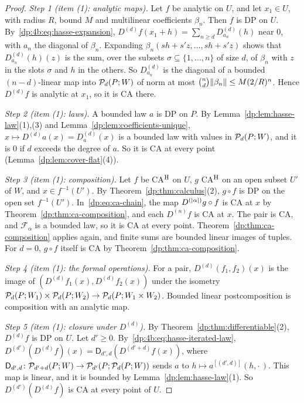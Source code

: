 \begin{proof}
\emph{Step 1 (item (1): analytic maps).} Let $f$ be analytic on $U$, and let $x_1\in U$, with radius $R$, bound $M$ and multilinear coefficients $\beta_n$. Then $f$ is DP on $U$. By~\eqref{dp:4b:eq:hasse-expansion}, $D^{(d)}f(x_1+h)=\sum_{n\ge d}D^{(d)}_{a_n}(h)$ near $0$, with $a_n$ the diagonal of $\beta_n$. Expanding $\beta_n(sh+s'z,\dots,sh+s'z)$ shows that $D^{(d)}_{a_n}(h)(z)$ is the sum, over the subsets $\sigma\subseteq\{1,\dots,n\}$ of size $d$, of $\beta_n$ with $z$ in the slots $\sigma$ and $h$ in the others. So $D^{(d)}_{a_n}$ is the diagonal of a bounded $(n-d)$-linear map into $\mathcal P_d(P;W)$ of norm at most $\binom nd\lVert \beta_n\rVert\le M(2/R)^n$. Hence $D^{(d)}f$ is analytic at $x_1$, so it is CA there.

\emph{Step 2 (item (1): laws).} A bounded law $a$ is DP on $P$. By Lemma~\ref{dp:lem:hasse-law}(1),(3) and Lemma~\ref{dp:lem:coefficients-unique}, $x\mapsto D^{(d)}a(x)=D^{(d)}_a(x)$ is a bounded law with values in $\mathcal P_d(P;W)$, and it is $0$ if $d$ exceeds the degree of $a$. So it is CA at every point (Lemma~\ref{dp:lem:cover-flat}(4)).

\emph{Step 3 (item (1): composition).} Let $f$ be CA$^{\rm H}$ on $U$, $g$ CA$^{\rm H}$ on an open subset $U'$ of $W$, and $x\in f^{-1}(U')$. By Theorem~\ref{dp:thm:calculus}(2), $g\circ f$ is DP on the open set $f^{-1}(U')$. In~\eqref{dp:eq:ca-chain}, the map $D^{(\lvert \alpha\rvert)}g\circ f$ is CA at $x$ by Theorem~\ref{dp:thm:ca-composition}, and each $D^{(n)}f$ is CA at $x$. The pair is CA, and $\mathcal F_\alpha$ is a bounded law, so it is CA at every point. Theorem~\ref{dp:thm:ca-composition} applies again, and finite sums are bounded linear images of tuples. For $d=0$, $g\circ f$ itself is CA by Theorem~\ref{dp:thm:ca-composition}.

\emph{Step 4 (item (1): the formal operations).} For a pair, $D^{(d)}(f_1,f_2)(x)$ is the image of $(D^{(d)}f_1(x),D^{(d)}f_2(x))$ under the isometry $\mathcal P_d(P;W_1)\times\mathcal P_d(P;W_2)\to\mathcal P_d(P;W_1\times W_2)$. Bounded linear postcomposition is composition with an analytic map.

\emph{Step 5 (item (1): closure under $D^{(d)}$).} By Theorem~\ref{dp:thm:differentiable}(2), $D^{(d)}f$ is DP on $U$. Let $d'\ge0$. By~\eqref{dp:4b:eq:hasse-iterated-law}, $D^{(d')}(D^{(d)}f)(x)=\mathsf D_{d',d}(D^{(d'+d)}f(x))$, where $\mathsf D_{d',d}\colon\mathcal P_{d'+d}(P;W)\to\mathcal P_{d'}(P;\mathcal P_d(P;W))$ sends $a$ to $h\mapsto a^{[(d',d)]}(h,\cdot\,)$. This map is linear, and it is bounded by Lemma~\ref{dp:lem:hasse-law}(1). So $D^{(d')}(D^{(d)}f)$ is CA at every point of $U$.


\end{proof}
